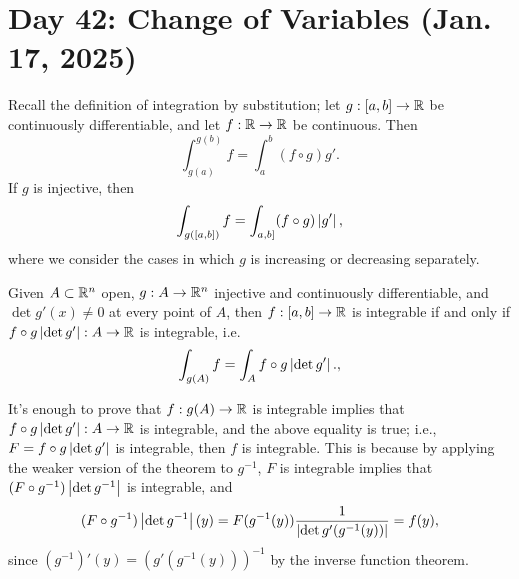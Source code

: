 \section{Day 42: Change of Variables (Jan. 17, 2025)}
Recall the definition of integration by substitution; let $g : [a, b] \to \mathbb R$ be continuously differentiable, and let $f : \mathbb R \to \mathbb R$ be continuous. Then
\[ \int_{g(a)}^{g(b)} f = \int_a^b (f \circ g) g'. \]
If $g$ is injective, then
\[ \int_{g([a, b])} f = \int_{a, b]} (f \circ g) \left\lvert g' \right\rvert, \]
where we consider the cases in which $g$ is increasing or decreasing separately.
\begin{simplethm}
    Given $A \subset \mathbb R^n$ open, $g : A \to \mathbb R^n$ injective and continuously differentiable, and $\det g'(x) \neq 0$ at every point of $A$, then $f : [a, b] \to \mathbb R$ is integrable if and only if $f \circ g \left\lvert \det g' \right\rvert : A \to \mathbb R$ is integrable, i.e.
    \[ \int_{g(A)} f = \int_A f \circ g \left\lvert \det g' \right\rvert., \] 
\end{simplethm}
\noindent It's enough to prove that $f : g(A) \to \mathbb R$ is integrable implies that $f \circ g \left\lvert \det g' \right\rvert : A \to \mathbb R$ is integrable, and the above equality is true; i.e., $F = f \circ g \left\lvert \det g' \right\rvert$ is integrable, then $f$ is integrable. This is because by applying the weaker version of the theorem to $g^{-1}$, $F$ is integrable implies that $(F \circ g^{-1}) \left\lvert \det g^{-1} \right\rvert$ is integrable, and
\[ (F \circ g^{-1}) \left\lvert \det g^{-1} \right\rvert (y) = F(g^{-1}(y)) \frac{1}{\left\lvert \det g'(g^{-1}(y)) \right\rvert} = f(y), \]
since $(g^{-1})'(y) = (g'(g^{-1}(y)))^{-1}$ by the inverse function theorem.